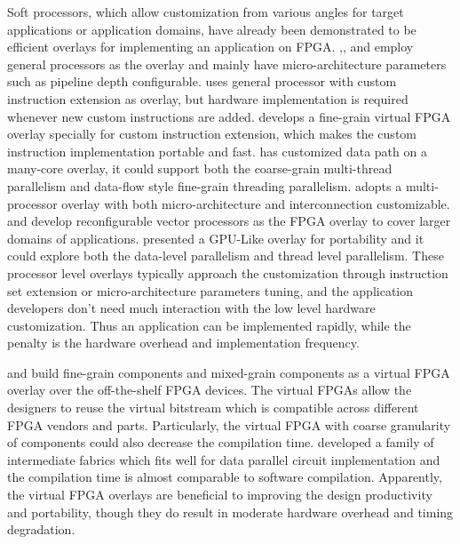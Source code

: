 Soft processors, which allow customization from various angles for target applications or application domains, have already been demonstrated to be efficient overlays for implementing an application on FPGA. \cite{Yiannacouras2007Exploration},\cite{microblaze}, and \cite{nios} employ general processors as the overlay and mainly have micro-architecture parameters such as pipeline depth configurable. \cite{grad2009woolcano} uses general processor with custom instruction extension as overlay, but hardware implementation is required whenever new custom instructions are added. \cite{Kock2013CI} develops a fine-grain virtual FPGA overlay specially for custom instruction extension, which makes the custom instruction implementation portable and fast. \cite{Lebedev2010} has customized data path on a many-core overlay, it could support both the coarse-grain multi-thread parallelism and data-flow style fine-grain threading parallelism. \cite{unnikrishnan2009application} adopts a multi-processor overlay with both micro-architecture and interconnection customizable. \cite{Guy2012VENICE} and \cite {Yiannacouras2009FPS} develop reconfigurable vector processors as the FPGA overlay to cover larger domains of applications. \cite{Jeffrey2011potential} presented a GPU-Like overlay for portability and it could explore both the data-level parallelism and thread level parallelism. These processor level overlays typically approach the customization through instruction set extension or micro-architecture parameters tuning, and the application developers don't need much interaction with the low level hardware customization. Thus an application can be implemented rapidly, while the penalty is the hardware overhead and implementation frequency.    

\cite{zuma2013carl} and \cite{Grant2011Malibu} build fine-grain components and mixed-grain components as a virtual FPGA overlay over the off-the-shelf FPGA devices. The virtual FPGAs allow the designers to reuse the virtual bitstream which is compatible across different FPGA vendors and parts. Particularly, the virtual FPGA with coarse granularity of components could also decrease the compilation time. \cite{Coole2010Intermediate} developed a family of intermediate fabrics which fits well for data parallel circuit implementation and the compilation time is almost comparable to software compilation. Apparently, the virtual FPGA overlays are beneficial to improving the design productivity and portability, though they do result in moderate hardware overhead and timing degradation.   

